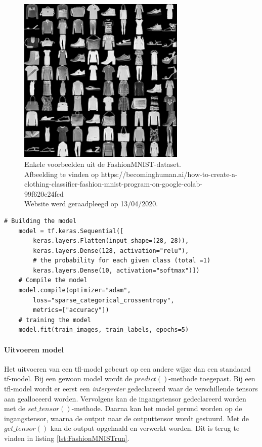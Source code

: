 			
			\begin{figure}
				\centering
				\includegraphics[width=80mm]{afbeeldingen/FashionMNIST_kledij.PNG}
				\caption{Enkele voorbeelden uit de FashionMNIST-dataset. \\Afbeelding te vinden op https://becominghuman.ai/how-to-create-a-clothing-classifier-fashion-mnist-program-on-google-colab-99f620c24fcd\\ Website werd geraadpleegd op 13/04/2020.}
				\label{fig:FashionMNIST-kledij}
			\end{figure}
	\begin{lstlisting}[caption={Cre\"eren en trainen van sequentieel model voor FashionMNIST.}, captionpos=b,label={lst:FashionMNISTtrain}]
	# Building the model
	model = tf.keras.Sequential([
		keras.layers.Flatten(input_shape=(28, 28)),
		keras.layers.Dense(128, activation="relu"),
		# the probability for each given class (total =1)
		keras.layers.Dense(10, activation="softmax")]) 
	# Compile the model
	model.compile(optimizer="adam",
		loss="sparse_categorical_crossentropy",
		metrics=["accuracy"])
	# training the model
	model.fit(train_images, train_labels, epochs=5)
	\end{lstlisting}			
						
			\paragraph{Uitvoeren model}
			Het uitvoeren van een \gls{tfl}-model gebeurt op een andere wijze dan een standaard \gls{tf}-model. Bij een gewoon model wordt de $predict()$-methode toegepast. Bij een \gls{tfl}-model wordt er eerst een \textit{interpreter} gedeclareerd waar de verschillende tensors aan gealloceerd worden. Vervolgens kan de ingangstensor gedeclareerd worden met de $set\_tensor()$-methode. Daarna kan het model gerund worden op de ingangstensor, waarna de output naar de outputtensor wordt gestuurd. Met de $get\_tensor()$ kan de output opgehaald en verwerkt worden. Dit is terug te vinden in listing \ref{lst:FashionMNISTrun}.
	
